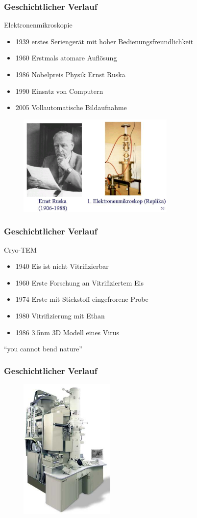 \begin{frame}
	\frametitle{Geschichtlicher Verlauf}
	\begin{block}{Elektronenmikroskopie}
		\begin{itemize}
			\item 1939 erstes Seriengerät mit hoher Bedienungsfreundlichkeit
			\item 1960 Erstmals atomare Auflösung 
			\item 1986 Nobelpreis Physik Ernst Ruska
			\item 1990 Einsatz von Computern
			\item 2005 Vollautomatische Bildaufnahme
		\end{itemize}
	\end{block}
	\begin{figure}
		\includegraphics[height = 5cm]{pic/ruska.png}
	\end{figure}
\end{frame}

\begin{frame}
	\frametitle{Geschichtlicher Verlauf}
	\begin{block}{Cryo-TEM}
		\begin{itemize}
			\item 1940 Eis ist nicht Vitrifizierbar
			\item 1960 Erste Forschung an Vitrifiziertem Eis
			\item 1974 Erste mit Stickstoff eingefrorene Probe
			\item 1980 Vitrifizierung mit Ethan
			\item 1986 3.5nm 3D Modell eines Virus
		\end{itemize}
	\end{block}
	"`you cannot bend nature"'
\end{frame}

\begin{frame}
	\frametitle{Geschichtlicher Verlauf}
	\begin{figure}
		\includegraphics[height = 7cm]{pic/jeol.jpg}
	\end{figure}
\end{frame}